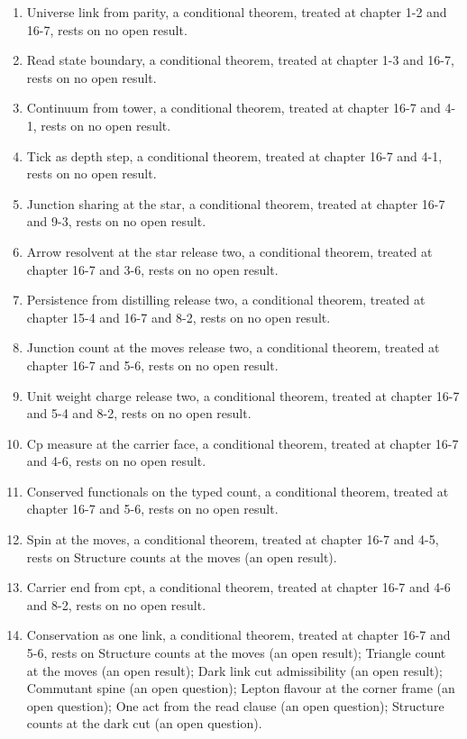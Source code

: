 \begin{enumerate}\setlength{\itemsep}{2pt}
\item Universe link from parity, a conditional theorem, treated at chapter 1-2 and 16-7, rests on no open result.
\item Read state boundary, a conditional theorem, treated at chapter 1-3 and 16-7, rests on no open result.
\item Continuum from tower, a conditional theorem, treated at chapter 16-7 and 4-1, rests on no open result.
\item Tick as depth step, a conditional theorem, treated at chapter 16-7 and 4-1, rests on no open result.
\item Junction sharing at the star, a conditional theorem, treated at chapter 16-7 and 9-3, rests on no open result.
\item Arrow resolvent at the star release two, a conditional theorem, treated at chapter 16-7 and 3-6, rests on no open result.
\item Persistence from distilling release two, a conditional theorem, treated at chapter 15-4 and 16-7 and 8-2, rests on no open result.
\item Junction count at the moves release two, a conditional theorem, treated at chapter 16-7 and 5-6, rests on no open result.
\item Unit weight charge release two, a conditional theorem, treated at chapter 16-7 and 5-4 and 8-2, rests on no open result.
\item Cp measure at the carrier face, a conditional theorem, treated at chapter 16-7 and 4-6, rests on no open result.
\item Conserved functionals on the typed count, a conditional theorem, treated at chapter 16-7 and 5-6, rests on no open result.
\item Spin at the moves, a conditional theorem, treated at chapter 16-7 and 4-5, rests on Structure counts at the moves (an open result).
\item Carrier end from cpt, a conditional theorem, treated at chapter 16-7 and 4-6 and 8-2, rests on no open result.
\item Conservation as one link, a conditional theorem, treated at chapter 16-7 and 5-6, rests on Structure counts at the moves (an open result); Triangle count at the moves (an open result); Dark link cut admissibility (an open result); Commutant spine (an open question); Lepton flavour at the corner frame (an open question); One act from the read clause (an open question); Structure counts at the dark cut (an open question).

\end{enumerate}
